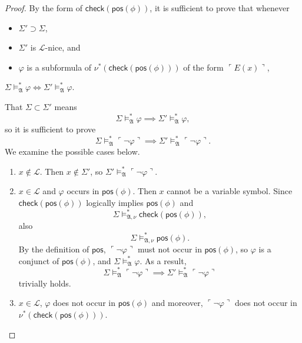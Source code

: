 \documentclass[12pt]{article}
\numberwithin{equation}{section}
\begin{document}
\begin{proof}
By the form of $\mathsf{check}(\mathsf{pos}(\phi))$, it is sufficient to prove that whenever 
\begin{itemize}
    \item $\Sigma' \supset \Sigma$,
    \item $\Sigma'$ is $\mathcal{L}$-nice, and
    \item $\varphi$ is a subformula of $\nu^*(\mathsf{check}(\mathsf{pos}(\phi)))$ of the form $\ulcorner E(x) \urcorner$,
\end{itemize}
 $\Sigma \models^*_{\mathfrak{A}} \varphi \iff \Sigma' \models^*_{\mathfrak{A}} \varphi$. 
 
That $\Sigma \subset \Sigma'$ means $$\Sigma \models^*_{\mathfrak{A}} \varphi \implies \Sigma' \models^*_{\mathfrak{A}} \varphi,$$ so it is sufficient to prove $$\Sigma \models^*_{\mathfrak{A}} \ulcorner \neg \varphi \urcorner \implies \Sigma' \models^*_{\mathfrak{A}} \ulcorner \neg \varphi \urcorner.$$ We examine the possible cases below.
\begin{enumerate}[label=Case \arabic*:, leftmargin=50pt]
    \item $x \not\in \mathcal{L}$. Then $x \not\in \Sigma'$, so $\Sigma' \models^*_{\mathfrak{A}} \ulcorner \neg \varphi \urcorner$.
    \item $x \in \mathcal{L}$ and $\varphi$ occurs in $\mathsf{pos}(\phi)$. Then $x$ cannot be a variable symbol. Since $\mathsf{check}(\mathsf{pos}(\phi))$ logically implies $\mathsf{pos}(\phi)$ and $$\Sigma \models^*_{\mathfrak{A}, \nu} \mathsf{check}(\mathsf{pos}(\phi)),$$ also $$\Sigma \models^*_{\mathfrak{A}, \nu} \mathsf{pos}(\phi).$$ By the definition of $\mathsf{pos}$, $\ulcorner \neg \varphi \urcorner$ must not occur in $\mathsf{pos}(\phi)$, so $\varphi$ is a conjunct of $\mathsf{pos}(\phi)$, and $\Sigma \models^*_{\mathfrak{A}} \varphi$. As a result, $$\Sigma \models^*_{\mathfrak{A}} \ulcorner \neg \varphi \urcorner \implies \Sigma' \models^*_{\mathfrak{A}} \ulcorner \neg \varphi \urcorner$$ trivially holds.
    \item $x \in \mathcal{L}$, $\varphi$ does not occur in $\mathsf{pos}(\phi)$ and moreover, $\ulcorner \neg \varphi \urcorner$ does not occur in $\nu^*(\mathsf{check}(\mathsf{pos}(\phi)))$. 
    

\end{enumerate}
\end{proof}
\end{document}
